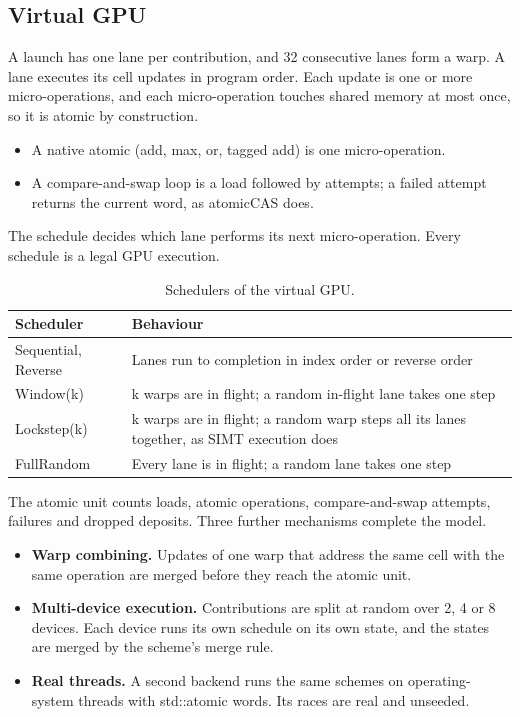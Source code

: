 \documentclass[journal]{IEEEtran}
\begin{document}
\hypertarget{virtual-gpu}{%
\subsection{Virtual GPU}\label{virtual-gpu}}

A launch has one lane per contribution, and 32 consecutive lanes form a
warp. A lane executes its cell updates in program order. Each update is
one or more micro-operations, and each micro-operation touches shared
memory at most once, so it is atomic by construction.

\begin{itemize}
\item
  A native atomic (add, max, or, tagged add) is one micro-operation.
\item
  A compare-and-swap loop is a load followed by attempts; a failed
  attempt returns the current word, as atomicCAS does.
\end{itemize}

The schedule decides which lane performs its next micro-operation. Every
schedule is a legal GPU execution.

\begin{table}[!htbp]\centering\small\setlength{\tabcolsep}{4pt}
\caption{Schedulers of the virtual GPU.}\label{tab:7}
\begin{tabularx}{\linewidth}{>{\raggedright\arraybackslash\hsize=0.667\hsize}X>{\raggedright\arraybackslash\hsize=1.333\hsize}X}
\toprule
Scheduler & Behaviour \\
\midrule
Sequential, Reverse & Lanes run to completion in index order or reverse order \\
Window(k) & k warps are in flight; a random in-flight lane takes one step \\
Lockstep(k) & k warps are in flight; a random warp steps all its lanes together, as
SIMT execution does \\
FullRandom & Every lane is in flight; a random lane takes one step \\
\bottomrule
\end{tabularx}
\end{table}

The atomic unit counts loads, atomic operations, compare-and-swap
attempts, failures and dropped deposits. Three further mechanisms
complete the model.

\begin{itemize}
\item
  \textbf{Warp combining.} Updates of one warp that address the same
  cell with the same operation are merged before they reach the atomic
  unit.
\item
  \textbf{Multi-device execution.} Contributions are split at random
  over 2, 4 or 8 devices. Each device runs its own schedule on its own
  state, and the states are merged by the scheme's merge rule.
\item
  \textbf{Real threads.} A second backend runs the same schemes on
  operating-system threads with std::atomic words. Its races are real
  and unseeded.
\end{itemize}
\end{document}
